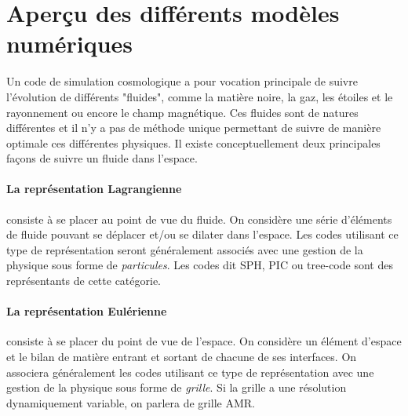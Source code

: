 \section{Aperçu des différents modèles numériques}
\label{sec:gridpart}
Un code de simulation cosmologique a pour vocation principale de suivre l'évolution de différents "fluides", comme la matière noire, la gaz, les étoiles et le rayonnement ou encore le champ magnétique.
Ces fluides sont de natures différentes et il n'y a pas de méthode unique permettant de suivre de manière optimale ces différentes physiques.
Il existe conceptuellement deux principales façons de suivre un fluide dans l'espace.

\paragraph{La représentation Lagrangienne} consiste à se placer au point de vue du fluide.
On considère une série d'éléments de fluide pouvant se déplacer et/ou se dilater dans l'espace.
Les codes utilisant ce type de représentation seront généralement associés avec une gestion de la physique sous forme de \emph{particules}.
Les codes dit \ac{SPH}, \ac{PIC} ou tree-code sont des représentants de cette catégorie.


\paragraph{La représentation Eulérienne} consiste à se placer du point de vue de l'espace.
On considère un élément d'espace et le bilan de matière entrant et sortant de chacune de ses interfaces.
On associera généralement les codes utilisant ce type de représentation avec une gestion de la physique sous forme de \emph{grille}.
Si la grille a une résolution dynamiquement variable, on parlera de grille \ac{AMR}.

